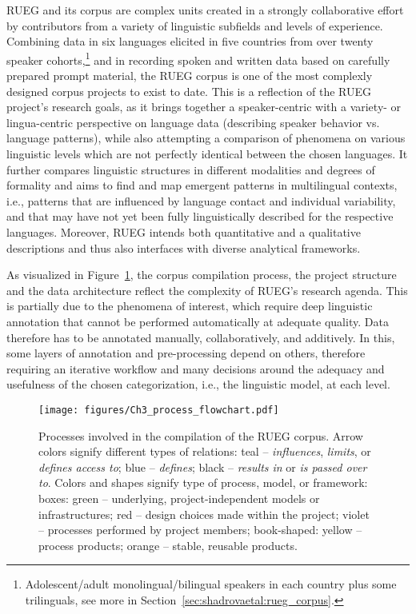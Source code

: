 \documentclass[output=paper,colorlinks,citecolor=brown]{langscibook}
\begin{document}
RUEG and its corpus are complex units created in a strongly collaborative effort by contributors from a variety of linguistic subfields and levels of experience. Combining data in six languages elicited in five countries from over twenty speaker cohorts,\footnote{Adolescent/adult monolingual/bilingual speakers in each country plus some trilinguals, see more in Section~\ref{sec:shadrovaetal:rueg_corpus}.} and in recording spoken and written data based on carefully prepared prompt material, the RUEG corpus is one of the most complexly designed corpus projects to exist to date. This is a reflection of the RUEG project's research goals, as it brings together a speaker-centric with a variety- or lingua-centric perspective on language data (describing speaker behavior vs. language patterns), while also attempting a comparison of phenomena on various linguistic levels which are not perfectly identical between the chosen languages. It further compares linguistic structures in different modalities and degrees of formality and aims to find and map emergent patterns in multilingual contexts, i.e., patterns that are influenced by language contact and individual variability, and that may have not yet been fully linguistically described for the respective languages. Moreover, RUEG intends both quantitative and a qualitative descriptions and thus also interfaces with diverse analytical frameworks.

As visualized in Figure~\ref{fig:shadrovaetal:process_flowchart}, the corpus compilation process, the project structure and the data architecture reflect the complexity of RUEG's research agenda. This is partially due to the phenomena of interest, which require deep linguistic annotation that cannot be performed automatically at adequate quality. Data therefore has to be annotated manually, collaboratively, and additively. In this, some layers of annotation and pre-processing depend on others, therefore requiring an iterative workflow and many decisions around the adequacy and usefulness of the chosen categorization, i.e., the linguistic model, at each level. 

\begin{figure}
    \centering
    \texttt{[image: figures/Ch3\_process\_flowchart.pdf]}
    \caption{Processes involved in the compilation of the RUEG corpus. Arrow colors signify different types of relations: teal -- \textit{influences}, \textit{limits}, or \textit{defines access to}; blue -- \textit{defines}; black -- \textit{results in} or \textit{is passed over to}. Colors and shapes signify type of process, model, or framework: boxes: green -- underlying, project-independent models or infrastructures; red -- design choices made within the project; violet -- processes performed by project members; book-shaped: yellow -- process products; orange -- stable, reusable products.}
    \label{fig:shadrovaetal:process_flowchart}
\end{figure}
\end{document}
